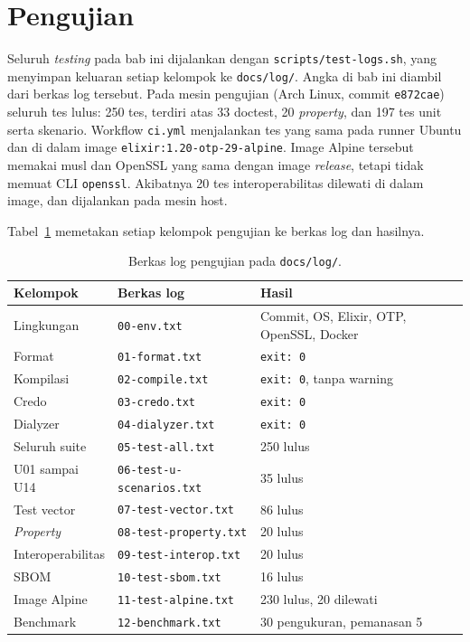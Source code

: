 \section{Pengujian}
\sloppy

Seluruh \textit{testing} pada bab ini dijalankan dengan \texttt{scripts/test-logs.sh}, yang
menyimpan keluaran setiap kelompok ke \texttt{docs/log/}. Angka di bab ini diambil dari berkas
log tersebut. Pada mesin pengujian (Arch Linux, commit \texttt{e872cae}) seluruh tes lulus: 250
tes, terdiri atas 33 doctest, 20 \textit{property}, dan 197 tes unit serta skenario. Workflow
\texttt{ci.yml} menjalankan tes yang sama pada runner Ubuntu dan di dalam image
\texttt{elixir:1.20-otp-29-alpine}. Image Alpine tersebut memakai musl dan OpenSSL yang sama
dengan image \textit{release}, tetapi tidak memuat CLI \texttt{openssl}. Akibatnya 20 tes
interoperabilitas dilewati di dalam image, dan dijalankan pada mesin host.

Tabel~\ref{tab:log} memetakan setiap kelompok pengujian ke berkas log dan hasilnya.

\begin{table}[H]
\centering
{\small
\begin{tabular}{@{}p{3.6cm}p{5.2cm}p{5.6cm}@{}}
\toprule
Kelompok & Berkas log & Hasil \\
\midrule
Lingkungan & \texttt{00-env.txt} & Commit, OS, Elixir, OTP, OpenSSL, Docker \\
Format & \texttt{01-format.txt} & \texttt{exit: 0} \\
Kompilasi & \texttt{02-compile.txt} & \texttt{exit: 0}, tanpa warning \\
Credo & \texttt{03-credo.txt} & \texttt{exit: 0} \\
Dialyzer & \texttt{04-dialyzer.txt} & \texttt{exit: 0} \\
Seluruh suite & \texttt{05-test-all.txt} & 250 lulus \\
U01 sampai U14 & \texttt{06-test-u-scenarios.txt} & 35 lulus \\
Test vector & \texttt{07-test-vector.txt} & 86 lulus \\
\textit{Property} & \texttt{08-test-property.txt} & 20 lulus \\
Interoperabilitas & \texttt{09-test-interop.txt} & 20 lulus \\
SBOM & \texttt{10-test-sbom.txt} & 16 lulus \\
Image Alpine & \texttt{11-test-alpine.txt} & 230 lulus, 20 dilewati \\
Benchmark & \texttt{12-benchmark.txt} & 30 pengukuran, pemanasan 5 \\
\bottomrule
\end{tabular}}
\caption{Berkas log pengujian pada \texttt{docs/log/}.}
\label{tab:log}
\end{table}

